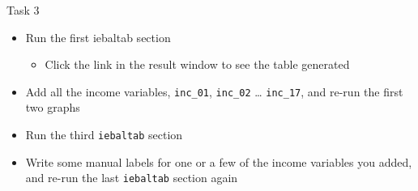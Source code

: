 \documentclass[aspectratio=169]{beamer}
\begin{document}
\begin{frame}{Task 3}
	\begin{itemize}
		\item Run the first iebaltab section
		\begin{itemize}
			\item Click the link in the result window to see the table generated
		\end{itemize}
		\item Add all the income variables, \texttt{inc\_01}, \texttt{inc\_02} … \texttt{inc\_17}, and re-run the first two graphs
		\item Run the third \texttt{iebaltab} section
		\item Write some manual labels for one or a few of the income variables you added, and re-run the last \texttt{iebaltab} section again
	\end{itemize}
\end{frame}
\end{document}
